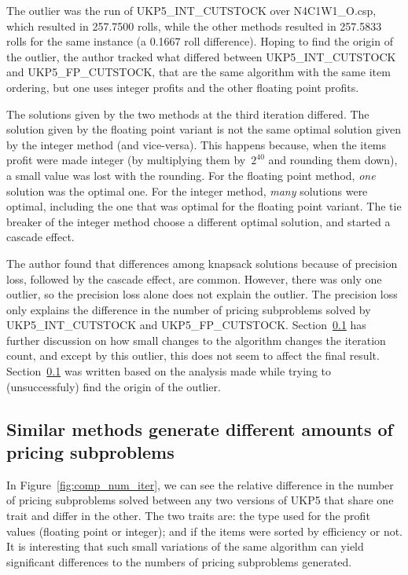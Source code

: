 The outlier was the run of UKP5\_INT\_CUTSTOCK over N4C1W1\_O.csp, which resulted in 257.7500 rolls, while the other methods resulted in 257.5833 rolls for the same instance (a 0.1667 roll difference).
Hoping to find the origin of the outlier, the author tracked what differed between UKP5\_INT\_CUTSTOCK and UKP5\_FP\_CUTSTOCK, that are the same algorithm with the same item ordering, but one uses integer profits and the other floating point profits.

The solutions given by the two methods at the third iteration differed.
The solution given by the floating point variant is not the same optimal solution given by the integer method (and vice-versa).
This happens because, when the items profit were made integer (by multiplying them by~\(2^{40}\) and rounding them down), a small value was lost with the rounding.
For the floating point method, \emph{one} solution was the optimal one.
For the integer method, \emph{many} solutions were optimal, including the one that was optimal for the floating point variant.
The tie breaker of the integer method choose a different optimal solution, and started a cascade effect.

The author found that differences among knapsack solutions because of precision loss, followed by the cascade effect, are common.
However, there was only one outlier, so the precision loss alone does not explain the outlier.
The precision loss only explains the difference in the number of pricing subproblems solved by UKP5\_INT\_CUTSTOCK and UKP5\_FP\_CUTSTOCK.
Section~\ref{sec:diff_it_count} has further discussion on how small changes to the algorithm changes the iteration count, and except by this outlier, this does not seem to affect the final result.
Section~\ref{sec:diff_it_count} was written based on the analysis made while trying to (unsuccessfuly) find the origin of the outlier.

\subsection{Similar methods generate different amounts of pricing subproblems}
\label{sec:diff_it_count}

In Figure~\ref{fig:comp_num_iter}, we can see the relative difference in the number of pricing subproblems solved between any two versions of UKP5 that share one trait and differ in the other.
The two traits are: the type used for the profit values (floating point or integer); and if the items were sorted by efficiency or not.
It is interesting that such small variations of the same algorithm can yield significant differences to the numbers of pricing subproblems generated. 

